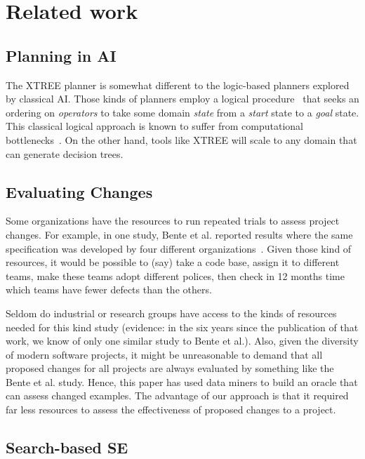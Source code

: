 \documentclass{sig-alternate}
\begin{document}
 
\section{Related work}

\subsection{Planning in AI}

The XTREE planner is somewhat different to the logic-based planners explored by 
classical AI. 
Those kinds of planners employ a logical procedure~\cite{Fikes1971}
that seeks an ordering on {\em operators} to take some domain
{\em state} from a {\em start} state to a {\em  goal} state.
This classical logical approach is known to suffer from
computational bottlenecks~\cite{Bylander1994}. On the other hand, tools like XTREE will scale to any domain
that can generate decision trees.
  
\subsection{Evaluating Changes}

Some organizations have the resources to 
run repeated trials to assess  project changes.
For example, in one   study, Bente et al. reported results
where the same  specification was developed by four different organizations~\cite{Anda2009}. Given those kind of resources, it would be possible
to (say) take a code base, assign it to different teams, make these teams  adopt different polices,
then check in 12 months time
 which teams have fewer defects than the others.  
 

Seldom do industrial or research groups have access
to the kinds of resources needed for this kind study  (evidence: in the six years since the
publication of that work, we know of only one   similar study to Bente et al.). Also, given the
diversity of modern software projects, it might be unreasonable to demand that all
proposed changes for all projects are always evaluated by something like the Bente et al. study.
Hence, this paper has used data miners to build an oracle that can assess changed examples. The advantage
of our approach is that it required far less resources to assess the effectiveness of proposed
changes to a project.  

\subsection{Search-based SE}
\end{document}
